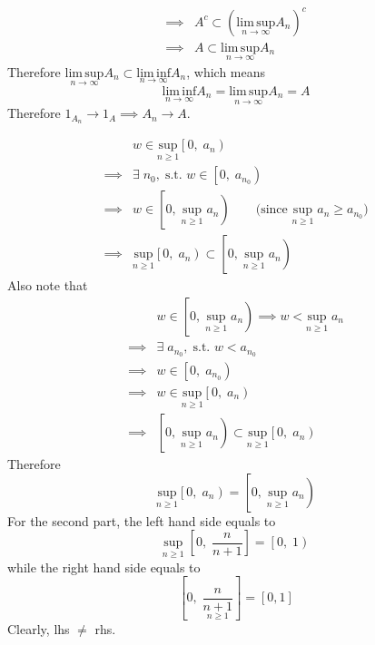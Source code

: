 \begin{list}{1.9.}{}
\[\begin{aligned}
      \implies & A^c \subset \left(\underset{n\to\infty}{\mathrm{lim\,sup}}A_n\right)^c    \\
      \implies & A \subset \underset{n\to\infty}{\mathrm{lim\,sup}}A_n
    \end{aligned}
  \]
  Therefore $\underset{n\to\infty}{\mathrm{lim\,sup}}A_n \subset \underset{n\to\infty}{\mathrm{lim\,inf}}A_n$, which means
  \[
    \underset{n\to\infty}{\mathrm{lim\,inf}}A_n = \underset{n\to\infty}{\mathrm{lim\,sup}}A_n = A
  \]
  Therefore $1_{A_n}\rightarrow 1_A \implies A_n\rightarrow A$.
  
\item
  \[
    \begin{aligned}
      & w \in \underset{n \geq 1}{\mathrm{sup}}\left[0,\; a_n\right)    \\
      \implies & \exists\; n_0,\; \text{s.t. } w \in \left[0,\; a_{n_0}\right)    \\
      \implies & w \in \left[0,\; \underset{n\geq 1}{\mathrm{sup}}\; a_{n}\right) \quad\quad
      \text{(since $\underset{n\geq 1}{\mathrm{sup}}\; a_{n} \geq a_{n_0}$)}    \\
      \implies & \underset{n \geq 1}{\mathrm{sup}}\left[0,\; a_n\right) \subset
      \left[0,\; \underset{n\geq 1}{\mathrm{sup}}\; a_{n}\right)
    \end{aligned}
  \]
  Also note that
  \[
    \begin{aligned}
      & w \in \left[0,\; \underset{n\geq 1}{\mathrm{sup}}\; a_{n}\right)
      \implies w < \underset{n\geq 1}{\mathrm{sup}}\; a_{n}\\
      \implies & \exists\; a_{n_0},\; \text{s.t. } w < a_{n_0}    \\
      \implies & w \in \left[0,\; a_{n_0}\right)    \\
      \implies & w \in \underset{n \geq 1}{\mathrm{sup}}\left[0,\; a_n\right)    \\
      \implies & \left[0,\; \underset{n\geq 1}{\mathrm{sup}}\; a_{n}\right) \subset
      \underset{n \geq 1}{\mathrm{sup}}\left[0,\; a_n\right)
    \end{aligned}
  \]
  Therefore
  \[
    \underset{n \geq 1}{\mathrm{sup}}\left[0,\; a_n\right)
    = \left[0,\; \underset{n\geq 1}{\mathrm{sup}}\; a_{n}\right)
  \]
  For the second part, the left hand side equals to
  \[
    \underset{n\geq 1}{\mathrm{sup}}\; \left[0,\; \frac{n}{n+1}\right] = \left[0,\; 1\right)
  \]
  while the right hand side equals to
  \[
    \left[0,\; \underset{n\geq 1}{\frac{n}{n+1}}\right] = \left[0, 1\right]
  \]
  Clearly, lhs $\neq$ rhs.
  

\end{list}
